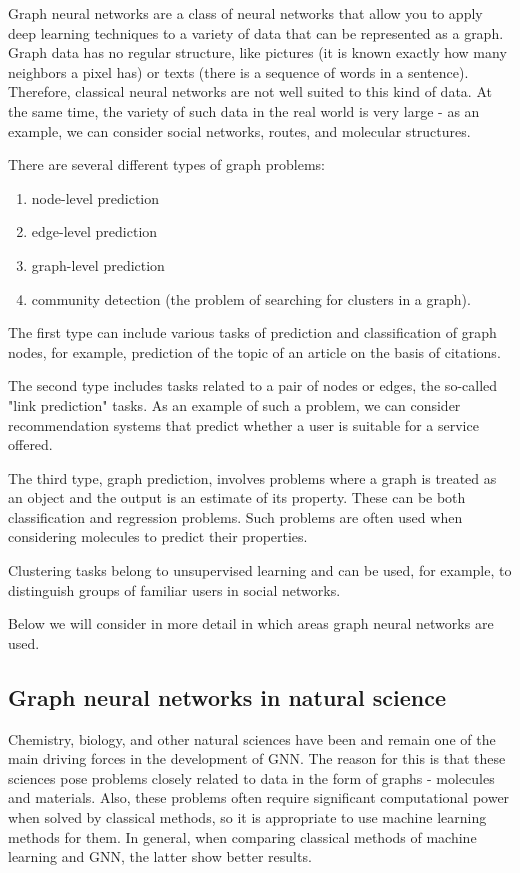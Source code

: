 \documentclass[a4paper,14pt]{article}
\begin{document}
Graph neural networks are a class of neural networks that allow you to apply deep learning techniques to a variety of data that can be represented as a graph. Graph data has no regular structure, like pictures (it is known exactly how many neighbors a pixel has) or texts (there is a sequence of words in a sentence). Therefore, classical neural networks are not well suited to this kind of data. At the same time, the variety of such data in the real world is very large - as an example, we can consider social networks, routes, and molecular structures. 

There are several different types of graph problems:
\begin{enumerate}
  \item node-level prediction
  \item edge-level prediction
  \item graph-level prediction
  \item community detection (the problem of searching for clusters in a graph).
\end{enumerate}

The first type can include various tasks of prediction and classification of graph nodes, for example, prediction of the topic of an article on the basis of citations. 

The second type includes tasks related to a pair of nodes or edges, the so-called "link prediction" tasks. As an example of such a problem, we can consider recommendation systems that predict whether a user is suitable for a service offered. 

The third type, graph prediction, involves problems where a graph is treated as an object and the output is an estimate of its property. These can be both classification and regression problems. Such problems are often used when considering molecules to predict their properties.

Clustering tasks belong to unsupervised learning and can be used, for example, to distinguish groups of familiar users in social networks.

Below we will consider in more detail in which areas graph neural networks are used.

\subsection{Graph neural networks in natural science}\label{4}

Chemistry, biology, and other natural sciences have been and remain one of the main driving forces in the development of GNN. The reason for this is that these sciences pose problems closely related to data in the form of graphs - molecules and materials. Also, these problems often require significant computational power when solved by classical methods, so it is appropriate to use machine learning methods for them. In general, when comparing classical methods of machine learning and GNN, the latter show better results.
\end{document}
